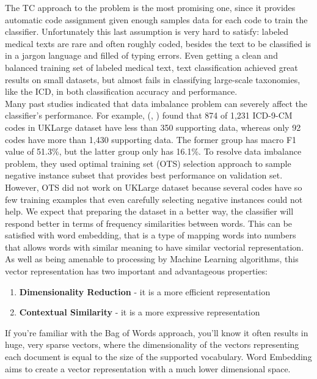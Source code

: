 The TC approach to the problem is the most promising one, since it provides automatic code assignment given enough samples data for each code to train the classifier. Unfortunately this last assumption is very hard to satisfy: labeled medical texts are rare and often roughly coded, besides the text to be classified is in a jargon language and filled of typing errors. Even getting a clean and
balanced training set of labeled medical text, text classification achieved great results on small datasets, but almost fails in classifying large-scale taxonomies, like the ICD, in both classification accuracy and performance.\cite{rizzo2015icd} \\
Many past studies indicated that data imbalance problem can severely affect the classifier’s performance. For example, (\citeauthor{kavuluru2015empirical}, \citeyear{kavuluru2015empirical})\cite{kavuluru2015empirical} found that 874 of 1,231 ICD-9-CM codes in UKLarge dataset have less than 350 supporting data, whereas only 92 codes have more than 1,430 supporting data. The former group has macro F1 value of 51.3\%, but the latter group only has 16.1\%. To resolve data imbalance problem, they used optimal training set (OTS) selection approach to sample negative instance subset that provides best performance on validation set. However, OTS did not work on UKLarge dataset because several codes have so few training examples that even carefully selecting negative instances could not help.
We expect that preparing the dataset in a better way, the classifier will respond better in terms of frequency similarities between words. This can be satisfied with word embedding, that is a type of mapping words into numbers that allows words with similar meaning to have similar vectorial representation.
As well as being amenable to processing by Machine Learning algorithms, this vector representation has two important and advantageous properties:
\begin{enumerate}
	\item \textbf{Dimensionality Reduction} - it is a more efficient representation
	\item \textbf{Contextual Similarity} - it is a more expressive representation
\end{enumerate}
If you’re familiar with the Bag of Words approach, you’ll know it often results in huge, very sparse vectors, where the dimensionality of the vectors representing each document is equal to the size of the supported vocabulary. Word Embedding aims to create a vector representation with a much lower dimensional space.
